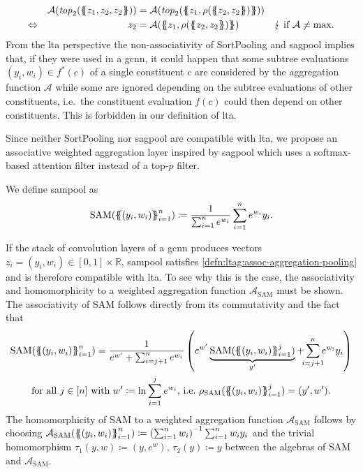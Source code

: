 \begin{enumerate}[label={\textbf{\arabic*.}}]
\begin{alignat*}{3}
			&& \mathcal{A}(\mathit{top}_{2}(\ldblbrace z_1, z_2, z_2 \rdblbrace)) &= \mathcal{A}(\mathit{top}_{2}(\ldblbrace z_1, \rho(\ldblbrace z_2, z_2 \rdblbrace) \rdblbrace))&& \\
			\Leftrightarrow&& z_2 &= \mathcal{A}(\ldblbrace z_1, \rho(\ldblbrace z_2, z_2 \rdblbrace) \rdblbrace)&&\lightning\text{ if $\mathcal{A} \neq \max$.}
		\end{alignat*}
		From the \ac{lta} perspective the non-associativity of SortPooling and \ac{sagpool} implies that, if they were used in a \ac{gcnn}, it could happen that some subtree evaluations $(y_i, w_i) \in f^{*}(c)$ of a single constituent $c$ are considered by the aggregation function $\mathcal{A}$ while some are ignored depending on the subtree evaluations of other constituents, i.e.\ the constituent evaluation $f(c)$ could then depend on other constituents.
		This is forbidden in our definition of \ac{lta}.
\end{enumerate}

Since neither SortPooling nor \ac{sagpool} are compatible with \ac{lta}, we propose an associative weighted aggregation layer inspired by \ac{sagpool} which uses a softmax-based attention filter instead of a top-$p$ filter.
\begin{defn}
	We define \ac{sampool} as
	\[\mathrm{SAM}({\ldblbrace (y_i, w_i) \rdblbrace}_{i=1}^n) \coloneqq\frac{1}{\sum_{i=1}^n e^{w_i}} \sum_{i=1}^n e^{w_i} y_i \text{.}\]
\end{defn}
If the stack of convolution layers of a \ac{gcnn} produces vectors $z_i = (y_i, w_i) \in [0, 1] \times \mathbb{R}$, \ac{sampool} satisfies \cref{defn:ltag:assoc-aggregation-pooling} and is therefore compatible with \acs{lta}.
To see why this is the case, the associativity and homomorphicity to a weighted aggregation function $\mathcal{A}_{\mathrm{SAM}}$ must be shown.
The associativity of $\mathrm{SAM}$ follows directly from its commutativity and the fact that
\begin{gather*}
	\mathrm{SAM}({\ldblbrace (y_i, w_i) \rdblbrace}_{i=1}^n) = \frac{1}{e^{w'} + \sum_{i=j+1}^n e^{w_i}} \left( e^{w'} \underbrace{\mathrm{SAM}({\ldblbrace (y_i, w_i) \rdblbrace}_{i=1}^j)}_{y'} + \smashoperator{\sum_{i=j+1}^n} e^{w_i} y_i \right) \\
	\text{for all } j \in [n] \text{ with } w' \coloneqq \ln\sum_{i=1}^{j} e^{w_i} \text{, i.e.\ } \rho_{\mathrm{SAM}}({\ldblbrace (y_i, w_i) \rdblbrace}_{i=1}^j) = (y', w')\text{.}
\end{gather*}
The homomorphicity of $\mathrm{SAM}$ to a weighted aggregation function $\mathcal{A}_{\mathrm{SAM}}$ follows by choosing $\mathcal{A}_{\mathrm{SAM}}({\ldblbrace (y_i, w_i) \rdblbrace}_{i=1}^n) \coloneqq {\left(\sum_{i=1}^n w_i\right)}^{-1} \sum_{i=1}^n w_i y_i$ and the trivial homomorphism $\tau_1(y, w) \coloneqq (y, e^w)$, $\tau_2(y) \coloneqq y$ between the algebras of $\mathrm{SAM}$ and $\mathcal{A}_{\mathrm{SAM}}$.

